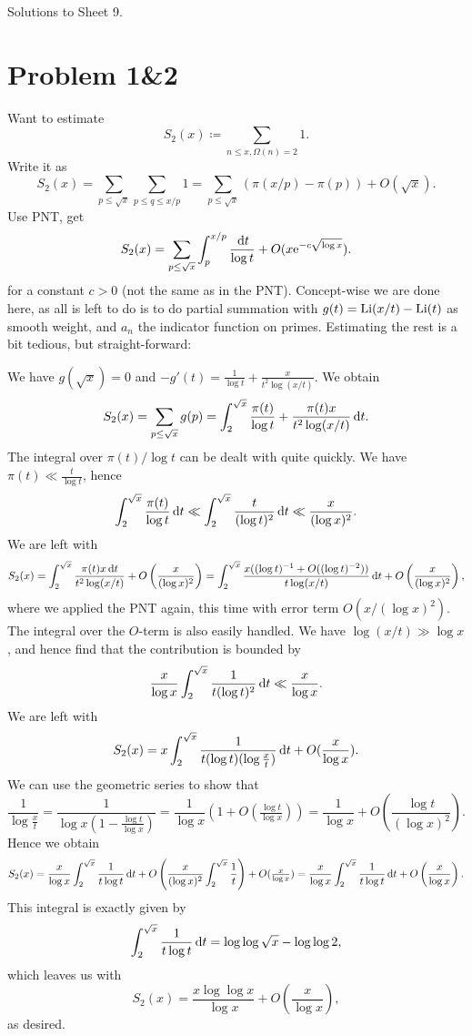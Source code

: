 \documentclass[a4paper,11pt]{article}
\author{Max von Consbruch}
\begin{document}
\begin{center}
    \huge{Solutions to Sheet 9.}
\end{center}

\section*{Problem 1\&2}

Want to estimate
\[
    S_2(x) \coloneqq \sum_{n \leq x, \Omega(n) = 2} 1.
\]
Write it as 
\[
    S_2(x) = \sum_{p \leq \sqrt x} \sum_{p \leq q \leq x/p} 1 =
    \sum_{p \leq \sqrt x} \left(\pi(x/p) - \pi(p)\right) + O(\sqrt x).
\]
Use PNT, get 
\[
    S_2(x) = \sum_{p \leq \sqrt x} \int_p^{x/p} \frac {\mathrm{\,d} t}{\log t} +
    O(x \mathrm e^{-c\sqrt{\log x}} ).
\]
for a constant $c>0$ (not the same as in the PNT).
Concept-wise we are done here, as all is left to do is to do partial summation
with $g(t) = \mathrm{Li}(x/t) - \mathrm{Li}(t)$ as smooth weight, and $a_n$ the indicator
function on primes. Estimating the rest is a bit tedious, but straight-forward:

We have $g(\sqrt x) = 0$ and $-g'(t) = \frac 1 {\log t} + \frac{x}{t^2
\log(x/t)}$. We obtain
\[
    S_2(x) = \sum_{p \leq \sqrt x} g(p) = 
    \int_2^{\sqrt x} \frac{\pi(t)}{\log t} + \frac{\pi(t) x}{t^2 \log(x/t)}
    \mathrm{\,d} t.
\]
The integral over $\pi(t)/\log t$ can be dealt with quite quickly. We have 
$\pi(t) \ll \frac t{\log t}$, hence
\[
    \int_2^{\sqrt x} \frac{\pi(t)}{\log t} \mathrm{\,d} t
    \ll \int_2^{\sqrt x} \frac t{(\log t)^2} \mathrm{\,d} t
    \ll \frac x{(\log x)^2}.
\]
We are left with
\[
    S_2(x) = \int_2^{\sqrt x} \frac{\pi(t) x \mathrm{\,d} t}{t^2 \log(x/t)} + O\left(\frac x
    {(\log x)^2}\right) = \int_2^{\sqrt x} \frac{x((\log t)^{-1} + O((\log t)^{-2}))}{t
\log(x/t)} \mathrm{\,d} t + O\left(\frac x{(\log x)^2}\right),
\]
where we applied the PNT again, this time with error term $O(x/(\log x)^2)$. 
The integral over the $O$-term is also easily handled. We have $\log(x/t) \gg
\log x$, and hence find that the contribution is bounded by 
\[
    \frac x{\log x} \int_2^{\sqrt x} \frac 1{t (\log t)^2} \mathrm{\,d} t
    \ll \frac x{\log x}. 
\]
We are left with
\[
    S_2(x) = x \int_2^{\sqrt x} \frac 1{t (\log t)(\log \tfrac xt)} \mathrm{\,d} t 
    + O(\frac x{\log x}).
\]
We can use the geometric series to show that 
\[
    \frac 1{\log \tfrac xt} = \frac 1{\log x (1- \tfrac{\log t}{\log x})}
    = \frac 1{\log x} \left( 1 + O(\tfrac {\log t}{\log x}) \right)
    = \frac 1 {\log x} + O\left(\frac{\log t}{(\log x)^2} \right).
\]
Hence we obtain
\[
    S_2(x) = \frac x{\log x} \int_2^{\sqrt x} \frac 1{t \log t} \mathrm{\,d} t
    + O\left(\frac x{(\log x)^2} \int_2^{\sqrt x} \frac 1t \right)+ O(\tfrac x{\log x}) 
    = \frac x{\log x} \int_2^{\sqrt x} \frac 1{t \log t} \mathrm{\,d} t + O\left( \frac
    {x}{\log x} \right).
\]
This integral is exactly given by 
\[
    \int_2^{\sqrt x} \frac 1{t \log t} \mathrm{\,d} t = 
    \log \log \sqrt x - \log \log 2,
\]
which leaves us with
\[
    S_2(x) = \frac{x \log \log x}{\log x} + O\left( \frac x{\log x}\right),
\]
as desired.
\end{document}
